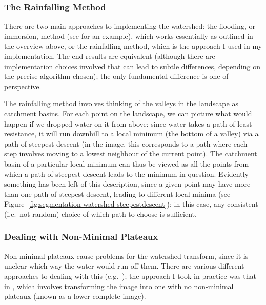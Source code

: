 \subsubsection{The Rainfalling Method}

There are two main approaches to implementing the watershed: the flooding, or immersion, method (see \cite{rambabu07} for an example), which works essentially as outlined in the overview above, or the rainfalling method, which is the approach I used in my implementation. The end results are equivalent (although there are implementation choices involved that can lead to subtle differences, depending on the precise algorithm chosen); the only fundamental difference is one of perspective.

The rainfalling method involves thinking of the valleys in the landscape as catchment basins. For each point on the landscape, we can picture what would happen if we dropped water on it from above: since water takes a path of least resistance, it will run downhill to a local minimum (the bottom of a valley) via a path of steepest descent (in the image, this corresponds to a path where each step involves moving to a lowest neighbour of the current point). The catchment basin of a particular local minimum can thus be viewed as all the points from which a path of steepest descent leads to the minimum in question. Evidently something has been left of this description, since a given point may have more than one path of steepest descent, leading to different local minima (see Figure~\ref{fig:segmentation-watershed-steepestdescent}): in this case, any consistent (i.e.~not random) choice of which path to choose is sufficient.


\subsubsection{Dealing with Non-Minimal Plateaux}

Non-minimal plateaux cause problems for the watershed transform, since it is unclear which way the water would run off them. There are various different approaches to dealing with this (e.g.~\cite{bieniek00,osma-ruiz06,stoev00}); the approach I took in practice was that in \cite{meijster98}, which involves transforming the image into one with no non-minimal plateaux (known as a lower-complete image).

